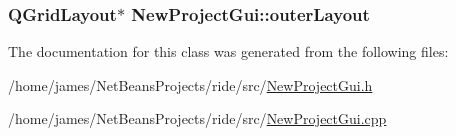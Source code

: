\hypertarget{class_new_project_gui_ab8c8c2da1803bbbc90d8aa5e90ac9aec}{
\subsubsection[{outer\-Layout}]{\setlength{\rightskip}{0pt plus 5cm}Q\-Grid\-Layout$\ast$ New\-Project\-Gui\-::outer\-Layout\hspace{0.3cm}{\ttfamily [private]}}}\label{class_new_project_gui_ab8c8c2da1803bbbc90d8aa5e90ac9aec}


The documentation for this class was generated from the following files\-:\begin{DoxyCompactItemize}
\item 
/home/james/\-Net\-Beans\-Projects/ride/src/\hyperlink{_new_project_gui_8h}{New\-Project\-Gui.\-h}\item 
/home/james/\-Net\-Beans\-Projects/ride/src/\hyperlink{_new_project_gui_8cpp}{New\-Project\-Gui.\-cpp}\end{DoxyCompactItemize}
